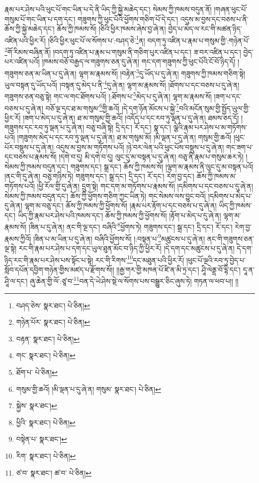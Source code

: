 རྣམ་པར་ཤེས་པའི་ཕུང་པོ་གང་ཡིན་པ་དེ་ནི་ཡིད་ཀྱི་སྐྱེ་མཆེད་དང་། སེམས་ཀྱི་ཁམས་བདུན་ནོ། །གཞན་ཕུང་པོ་གསུམ་པོ་གང་ཡིན་པ་དག་དང་། གཟུགས་ཀྱི་ཕུང་པོའི་ཕྱོགས་གཅིག་པོ་དེ་དང་། འདུས་མ་བྱས་དང་བཅས་པ་ནི་ཆོས་ཀྱི་སྐྱེ་མཆེད་དང་། ཆོས་ཀྱི་ཁམས་སོ། །ཅིའི་ཕྱིར་ཁམས་ཞེས་བྱ་ཞེ་ན། བྱེད་པ་མེད་ལ་རང་གི་མཚན་ཉིད་འཛིན་པའི་ཕྱིར་རོ། །ཅིའི་ཕྱིར་ཕུང་པོ་ལ་སོགས་པ་:བཤད་ཅེ་\footnote{བཤད་ཅེས་  སྣར་ཐང་།  པེ་ཅིན། }ན། བདག་ཏུ་འཛིན་པ་རྣམ་པ་གསུམ་གྱི་:གཉེན་པོ་\footnote{གཉེན་པོར་  སྣར་ཐང་།  པེ་ཅིན། }གོ་རིམས་བཞིན་ནོ། །བདག་ཏུ་འཛིན་པ་རྣམ་པ་གསུམ་ནི་གཅིག་པུར་འཛིན་པ་དང་། ཟ་བར་འཛིན་པ་དང་། བྱེད་པར་འཛིན་པའོ། །ཁམས་བཅོ་བརྒྱད་ལ་གཟུགས་ཅན་དུ་ཞེ་ན། གང་དག་གཟུགས་ཀྱི་ཕུང་པོའི་ངོ་བོ་ཉིད་དོ། །གཟུགས་ཅན་མ་ཡིན་པ་དུ་ཞེ་ན། ལྷག་མ་རྣམས་སོ། །བརྟེན་\footnote{བརྟན་  སྣར་ཐང་།  པེ་ཅིན། }དུ་ཡོད་པ་དུ་ཞེ་ན། གཟུགས་ཀྱི་ཁམས་གཅིག་སྟེ། ཡུལ་བསྟན་དུ་ཡོད་པའོ། །བསྟན་དུ་མེད་པ་ནི་\footnote{གང་  སྣར་ཐང་།  པེ་ཅིན། }དུ་ཞེ་ན། ལྷག་མ་རྣམས་སོ། །ཐོགས་པ་དང་བཅས་པ་དུ་ཞེ་ན། གཟུགས་ཅན་བཅུ་སྟེ། གང་ལ་གང་ཐོགས་པའོ། །:ཐོགས་པ་\footnote{ཐོག་པ་  པེ་ཅིན། }མེད་པ་དུ་ཞེ་ན། ལྷག་མ་རྣམས་སོ། །ཟག་པ་དང་བཅས་པ་དུ་ཞེ་ན། བཅོ་ལྔ་དང་ཐ་མ་གསུམ་\footnote{གསུམ་གྱི་ཆའོ། །མི་ལྡན་པ་དུ་ཞེ་ན། གསུམ་  སྣར་ཐང་།  པེ་ཅིན། }གྱི་ཆའོ། །དེ་དག་ཉོན་མོངས་པ་སྐྱེ་\footnote{སྐྱེས་  སྣར་ཐང་། }བའི་མངོན་སུམ་གྱི་སྤྱོད་ཡུལ་གྱི་ཕྱིར་རོ། །ཟག་པ་མེད་པ་དུ་ཞེ་ན། ཐ་མ་གསུམ་གྱི་ཆའོ། །འདོད་པ་དང་རབ་ཏུ་ལྡན་པ་དུ་ཞེ་ན། ཐམས་ཅད་དོ། །གཟུགས་དང་རབ་ཏུ་ལྡན་པ་དུ་ཞེ་ན། བཅུ་བཞི་སྟེ། དྲི་དང་། རོ་དང་། སྣ་དང་། ལྕེའི་རྣམ་པར་ཤེས་པ་མ་གཏོགས་པའོ། །གཟུགས་མེད་པ་དང་རབ་ཏུ་ལྡན་པ་དུ་ཞེ་ན། ཐ་མ་གསུམ་མོ། །མི་ལྡན་པ་དུ་ཞེ་ན། གསུམ་གྱི་ཆའོ། །ཕུང་པོར་བསྡུས་པ་དུ་ཞེ་ན། འདུས་མ་བྱས་མ་གཏོགས་པའོ། །ཉེ་བར་ལེན་པའི་ཕུང་པོས་བསྡུས་པ་དུ་ཞེ་ན། གང་ཟག་པ་དང་བཅས་པ་རྣམས་སོ། །དགེ་བ་དུ། མི་དགེ་བ་དུ། ལུང་དུ་མ་བསྟན་པ་དུ་ཞེ་ན། བཅུ་ནི་རྣམ་པ་གསུམ་ཆར་ཏེ། །སེམས་ཀྱི་ཁམས་བདུན་དང་། གཟུགས་དང་། སྒྲ་དང་། ཆོས་ཀྱི་ཁམས་སོ། །ལྷག་མ་རྣམས་ནི་ལུང་དུ་མ་བསྟན་པའོ། །ནང་གི་དུ་ཞེ་ན། བཅུ་གཉིས་ཏེ། གཟུགས་དང་། སྒྲ་དང་། དྲི་དང་། རོ་དང་། རེག་བྱ་དང་། ཆོས་ཀྱི་ཁམས་མ་གཏོགས་པའོ། །ཕྱི་རོལ་གྱི་དུ་ཞེ་ན། དྲུག་སྟེ། གང་དག་མ་གཏོགས་པ་རྣམས་སོ། །དམིགས་པ་དང་བཅས་པ་དུ་ཞེ་ན། སེམས་ཀྱི་ཁམས་བདུན་དང་། ཆོས་ཀྱི་ཕྱོགས་གཅིག་ཀྱང་ཡིན་ཏེ། གང་སེམས་ལས་བྱུང་བའོ། །དམིགས་པ་མེད་པ་དུ་ཞེ་ན། ལྷག་མ་བཅུ་དང་། ཆོས་ཀྱི་ཁམས་ཀྱི་ཕྱོགས་སོ། །རྣམ་པར་རྟོག་པ་དང་བཅས་པ་དུ་ཞེ་ན། ཡིད་ཀྱི་ཁམས་དང་། ཡིད་ཀྱི་རྣམ་པར་ཤེས་པའི་ཁམས་དང་། ཆོས་ཀྱི་ཁམས་ཀྱི་ཕྱོགས་སོ། །རྟོག་པ་མེད་པ་དུ་ཞེ་ན། ལྷག་མ་རྣམས་སོ། །ཟིན་པ་དུ་ཞེ་ན། ནང་གི་ལྔ་དང་། བཞིའི་\footnote{ཕྱིའི་  སྣར་ཐང་།  པེ་ཅིན། }ཕྱོགས་ཏེ། གཟུགས་དང་། སྒྲ་དང་། དྲི་དང་། རོ་དང་། རེག་བྱ་རྣམས་ཀྱིའོ། །ཟིན་པ་མ་ཡིན་པ་དུ་ཞེ་ན། བཞིའི་ཕྱོགས་སོ། །:བསྟན་པ་\footnote{བསྟེན་པ་  སྣར་ཐང་། }མཚུངས་པ་དུ་ཞེ་ན། ནང་གི་གཟུགས་ཅན་ལྔ་སྟེ། རང་གི་རྣམ་པར་ཤེས་པ་དག་དང་ཡུལ་ཐུན་མོང་བ་ཉིད་ཀྱི་ཕྱིར་རོ། །དེ་དག་དང་མཚུངས་པ་དུ་ཞེ་ན། དེ་དག་ཉིད་རང་གི་རྣམ་པར་ཤེས་པས་སྟོང་པ་སྟེ། རང་གི་རིགས་\footnote{རིག་  སྣར་ཐང་།  པེ་ཅིན། }དང་མཐུན་པའི་ཕྱིར་རོ། །ཕུང་པོ་ལྔའི་རབ་ཏུ་བྱེད་པ་སློབ་དཔོན་དབྱིག་གཉེན་གྱིས་མཛད་པ་རྫོགས་སོ།། །།རྒྱ་གར་གྱི་མཁན་པོ་ཛི་ན་མི་ཏྲ་དང་། ཤཱི་ལེནྡྲ་བོ་དྷི་དང་། དཱ་ན་ཤཱི་ལ་དང་། ཞུ་ཆེན་གྱི་ལོ་:ཙཱ་བ་\footnote{ཙ་བ་  སྣར་ཐང་། ཚ་བ་  པེ་ཅིན། }བན་དེ་ཡེ་ཤེས་སྡེ་ལ་སོགས་པས་བསྒྱུར་ཅིང་ཞུས་ཏེ། གཏན་ལ་ཕབ་པ།། །།